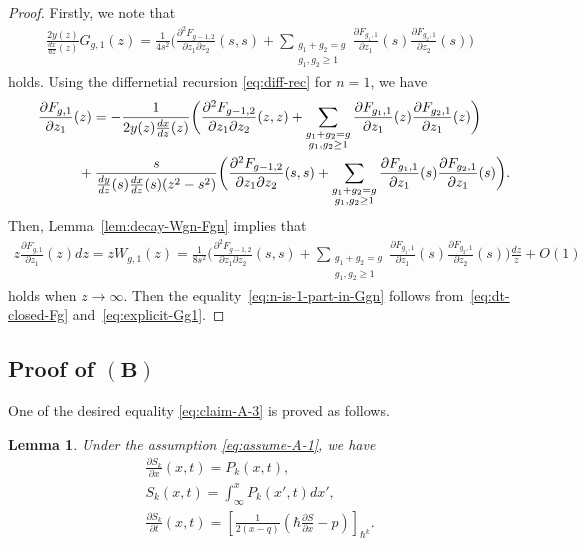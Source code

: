 \documentclass[pdftex]{sigma}
\newtheorem{lem}[thm]{Lemma}
\theoremstyle{definition}
\numberwithin{equation}{section}
\def\p{\partial}
\begin{document}
\begin{proof}
Firstly, we note that
\begin{gather} \label{eq:explicit-Gg1}
\frac{2y(z)}{\frac{dx}{dz}(z)} G_{g,1}(z) =
\frac{1}{4s^{2}}
\biggl(
\frac{\p^{2} F_{g-1,2}}{\p z_{1} \p z_{2}}(s,s) +
\sum_{\substack{g_{1}+g_{2} = g \\ g_{1}, g_{2} \ge 1}}
\frac{\p F_{g_{1}, 1}}{\p z_{1}}(s)
\frac{\p F_{g_{2}, 1}}{\p z_{2}}(s)
\biggr)
\end{gather}
holds. Using the dif\/fernetial recursion \eqref{eq:diff-rec}
for $n=1$, we have
\begin{gather*}
\frac{\p F_{g,1}}{\p z_{1}} (z) =
- \frac{1}{2y(z)\frac{dx}{dz}(z)}
\biggl(
\frac{\p^{2} F_{g-1,2}}{\p z_{1} \p z_{2}}(z,z) +
\sum_{\substack{g_{1}+g_{2} = g \\ g_{1}, g_{2} \ge 1}}
\frac{\p F_{g_{1}, 1}}{\p z_{1}}(z)
\frac{\p F_{g_{2}, 1}}{\p z_{1}}(z)
\biggr)
\\
\hphantom{\frac{\p F_{g,1}}{\p z_{1}} (z) =}{}
+ \frac{s}{\frac{dy}{dz}(s)\frac{dx}{dz}(s)(z^{2}-s^{2})}
\biggl(
\frac{\p^{2} F_{g-1,2}}{\p z_{1} \p z_{2}}(s,s) +
\sum_{\substack{g_{1}+g_{2} = g \\ g_{1}, g_{2} \ge 1}}
\frac{\p F_{g_{1}, 1}}{\p z_{1}}(s)
\frac{\p F_{g_{2}, 1}}{\p z_{1}}(s)
\biggr).
\end{gather*}
Then, Lemma~\ref{lem:decay-Wgn-Fgn}
implies that
\begin{gather*}
z\frac{\p F_{g,1}}{\p z_{1}} (z)dz
= z W_{g,1}(z)  = \frac{1}{8s^{2}} \biggl(
\frac{\p^{2} F_{g-1,2}}{\p z_{1} \p z_{2}}(s,s) +
\sum_{\substack{g_{1}+g_{2} = g \\ g_{1}, g_{2} \ge 1}}
\frac{\p F_{g_{1}, 1}}{\p z_{1}}(s)
\frac{\p F_{g_{2}, 1}}{\p z_{2}}(s)
\biggr) \frac{dz}{z} + O(1)
\end{gather*}
holds when $z \rightarrow \infty$.
Then the equality~\eqref{eq:n-is-1-part-in-Ggn}
follows from~\eqref{eq:dt-closed-Fg} and~\eqref{eq:explicit-Gg1}.
\end{proof}

\subsection[Proof of $(B)$]{Proof of $\boldsymbol{(B)}$}

One of the desired equality \eqref{eq:claim-A-3} is proved as follows.

\begin{lem} \label{prop:integral-for-Sm}
Under the assumption \eqref{eq:assume-A-1}, we have
\begin{gather}
\label{eq:claim-A-5}
\frac{\p S_{k}}{\p x}(x,t)  =   P_{k}(x,t), \\
\label{eq:claim-A-4}
S_{k}(x,t)   =   \int^{x}_{\infty} P_{k}(x',t)dx', \\
\label{eq:claim-A-2}
\frac{\p S_{k}}{\p t}(x,t)   =   \left[\frac{1}{2(x-q)}
\left(\hbar \frac{\p S}{\p x} - p \right) \right]_{\hbar^{k}}.
\end{gather}
\end{lem}
\end{document}

